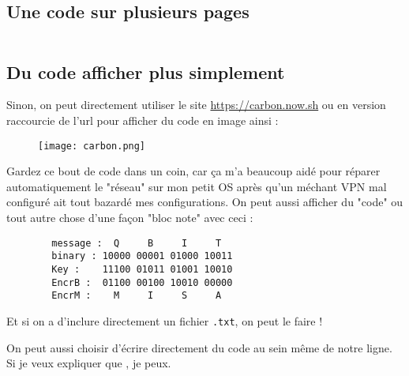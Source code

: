 \subsection{Une code sur plusieurs pages}

\inputminted{python}{src/parts/code/example2.py}


\subsection{Du code afficher plus simplement}

Sinon, on peut directement utiliser le site \url{https://carbon.now.sh} ou en version raccourcie de l'url  pour afficher du code en image ainsi :
\begin{figure}[H]
    \centering
    \texttt{[image: carbon.png]}
\end{figure}

Gardez ce bout de code dans un coin, car ça m'a beaucoup aidé pour réparer automatiquement le
"réseau" sur mon petit OS après qu'un méchant VPN mal configuré ait tout bazardé mes
configurations.
\ideaEnd
On peut aussi afficher du "code" ou tout autre chose d'une façon "bloc note" avec ceci :
\begin{mycodebox}
    \begin{verbatim}
        message :  Q     B     I     T
        binary : 10000 00001 01000 10011
        Key :    11100 01011 01001 10010
        EncrB :  01100 00100 10010 00000
        EncrM :    M     I     S     A
    \end{verbatim}
\end{mycodebox}

Et si on a  d'inclure directement un fichier \texttt{.txt}, on peut le faire !


On peut aussi choisir d'écrire directement du code au sein même de notre ligne. Si je veux expliquer que
, je peux.

